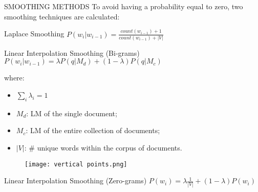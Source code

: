 \begin{frame}{SMOOTHING METHODS}
    To avoid having a probability equal to zero, two smoothing techniques are calculated:
    \begin{minipage}{\linewidth}
        \centering
        \begin{minipage}{0.45\linewidth}
            \begin{block}{\centering Laplace Smoothing}
                \centering\small $ P(w_i|w_{i-1}) = \frac{count(w_{i-1})+1}{count(w_{i-1})+|V|} $
            \end{block}
        \end{minipage}
        \hspace{0.05\linewidth}
        \begin{minipage}{0.45\linewidth}
            \begin{block}{\centering Linear Interpolation Smoothing (Bi-grams)}
                \centering \scriptsize $ P(w_i|w_{i-1}) = \lambda P(q|M_d) + (1-\lambda)P(q|M_c) $
            \end{block}
        \end{minipage}
    \end{minipage}
    \begin{minipage}{\linewidth}
        \centering
        \begin{minipage}{0.45\linewidth}
            where:
            \begin{itemize}
                \item $\sum_i \lambda_i = 1$
                \item $M_d$: LM of the single document;
                \item $M_c$: LM of the entire collection of documents;
                \item $|V|$: \# unique words within the corpus of documents.
            \end{itemize}
        \end{minipage}
        \hspace{0.05\linewidth}
        \begin{minipage}{0.45\linewidth}
            \begin{figure}[H]
                \centering
                \texttt{[image: vertical points.png]}
                \centering
            \end{figure}
            \begin{block}{\centering Linear Interpolation Smoothing (Zero-grams)\footnotemark}
                \centering \small $ P(w_i) = \lambda \frac{1}{|V|} + (1-\lambda)P(w_i) $
            \end{block}
        \end{minipage}
    \end{minipage}
\end{frame}

